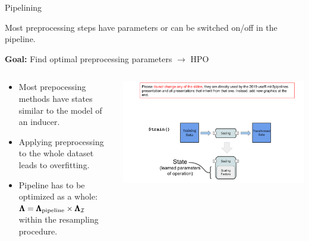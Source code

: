 \begin{frame}{Pipelining}

Most preprocessing steps have parameters or can be switched on/off in the pipeline.

\textbf{Goal:} Find optimal preprocessing parameters $\rightarrow$ HPO

\begin{columns}
  \begin{column}{0.5\textwidth}
  \begin{itemize}
    \item Most prepocessing methods have states similar to the model of an inducer.
    \item Applying preprocessing to the whole dataset leads to overfitting.
    \item Pipeline has to be optimized as a whole: $\pmb{\Lambda} = \pmb{\Lambda}_{\text{pipeline}} \times \pmb{\Lambda}_{\mathcal{I}}$ within the resampling procedure.
  \end{itemize}
  \end{column}%
  \begin{column}{0.5\textwidth}
    \begin{center}
      \includegraphics[page=19, width=\textwidth, trim=20 60 30 35, clip]{images/mlr3Pipelines_graphics}
    \end{center}
  \end{column}
\end{columns}

\end{frame}

